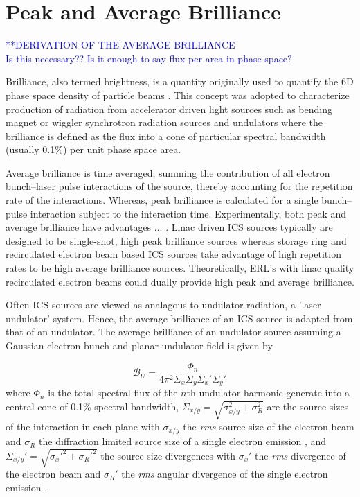 \documentclass[../main.tex]{subfiles}
\begin{document}
\section{Peak and Average Brilliance}
\textcolor{blue}{**DERIVATION OF THE AVERAGE BRILLIANCE \\ Is this necessary?? Is it enough to say flux per area in phase space?}

Brilliance, also termed brightness, is a quantity originally used to quantify the 6D phase space density of particle beams \cite{courant1958theory}. This concept was adopted to characterize production of radiation from accelerator driven light sources such as bending magnet or wiggler synchrotron radiation sources and undulators \cite{kim1989characteristics} where the brilliance is defined as the flux into a cone of particular spectral bandwidth (usually 0.1\%) per unit phase space area. 

Average brilliance is time averaged, summing the contribution of all electron bunch--laser pulse interactions of the source, thereby accounting for the repetition rate of the interactions. Whereas, peak brilliance is calculated for a single bunch--pulse interaction subject to the interaction time. Experimentally, both peak and average brilliance have advantages ... . Linac driven ICS sources typically are designed to be single-shot, high peak brilliance sources whereas storage ring and recirculated electron beam based ICS sources take advantage of high repetition rates to be high average brilliance sources. Theoretically, ERL's with linac quality recirculated electron beams could dually provide high peak and average brilliance.   

Often ICS sources are viewed as analagous to undulator radiation, a 'laser undulator' system. Hence, the average brilliance of an ICS source is adapted from that of an undulator. The average brilliance of an undulator source assuming a Gaussian electron bunch and planar undulator field \cite{chao2013handbook} is given by 

\begin{equation}
\mathcal{B}_{U} = \frac{\Phi_{n}}{4\pi^{2}\Sigma_{x}\Sigma_{y}\Sigma_{x}'\Sigma_{y}'}
\label{eq:undulator_brightness}    
\end{equation}
where $\Phi_{n}$ is the total spectral flux of the $n$th undulator harmonic generate into a central cone of 0.1\% spectral bandwidth, $\Sigma_{x/y} = \sqrt{\sigma_{x/y}^{2}+\sigma_{R}^{2}}$ are the source sizes of the interaction in each plane with $\sigma_{x/y}$ the \textit{rms} source size of the electron beam and $\sigma_{R}$ the diffraction limited source size of a single electron emission \cite{kim1987brightness}, and $\Sigma_{x/y}' = \sqrt{\sigma_{x}'^{2}+\sigma_{R}'^{2}}$ the source size divergences with $\sigma_{x}'$ the \textit{rms} divergence of the electron beam and $\sigma_{R}'$ the \textit{rms} angular divergence of the single electron emission \cite{krinsky1983undulators}. 
\end{document}
